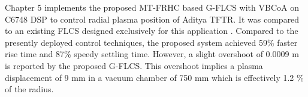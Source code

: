
Chapter 5 implements the proposed MT-FRHC based G-FLCS with VBCoA on C6748 DSP to control radial plasma position of Aditya TFTR. It was compared to an existing FLCS designed exclusively for this application \cite{Suratia2012}. Compared to the presently deployed control techniques, the proposed system achieved 59\% faster rise time and 87\% speedy settling time. However, a slight overshoot of 0.0009 m is reported by the proposed G-FLCS. This overshoot implies a plasma displacement of 9 mm in a vacuum chamber of 750 mm which is effectively 1.2 \% of the radius. 

